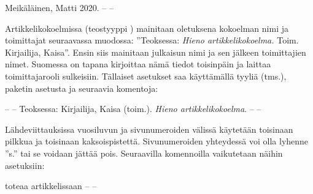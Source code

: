 \begin{koodilohkosis}
\usepackage[style=ext-authoryear]{biblatex}

\end{koodilohkosis}

\begin{tulossis}
  Meikäläinen, Matti 2020. -- --
\end{tulossis}

\noindent
Artikkelikokoelmissa (teostyyppi ) mainitaan
oletuksena kokoelman nimi ja toimittajat seuraavassa muodossa:
''Teoksessa: \textit{Hieno artikkelikokoelma.} Toim. Kirjailija,
Kaisa''. Ensin siis mainitaan julkaisun nimi ja sen jälkeen toimittajien
nimet. Suomessa on tapana kirjoittaa nämä tiedot toisinpäin ja laittaa
toimittajarooli sulkeisiin. Tällaiset asetukset saa käyttämällä tyyliä
 (tms.), paketin asetusta
 ja seuraavia komentoja:

\begin{koodilohkosis}
\usepackage[style=ext-authoryear, innamebeforetitle=true]{biblatex}

\end{koodilohkosis}

\begin{tulossis}
  -- -- Teoksessa: Kirjailija, Kaisa (toim.). \textit{Hieno
    artikkelikokoelma}. -- --
\end{tulossis}

\noindent
Lähdeviittauksissa vuosiluvun ja sivunumeroiden välissä käytetään
toisinaan pilkkua ja toisinaan kaksoispistettä. Sivunumeroiden
yhteydessä voi olla lyhenne ''s.'' tai se voidaan jättää pois.
Seuraavilla komennoilla vaikutetaan näihin asetuksiin:

\begin{koodilohkosis}

\textcite[15--16]{tunniste} toteaa artikkelissaan -- --
\end{koodilohkosis}

